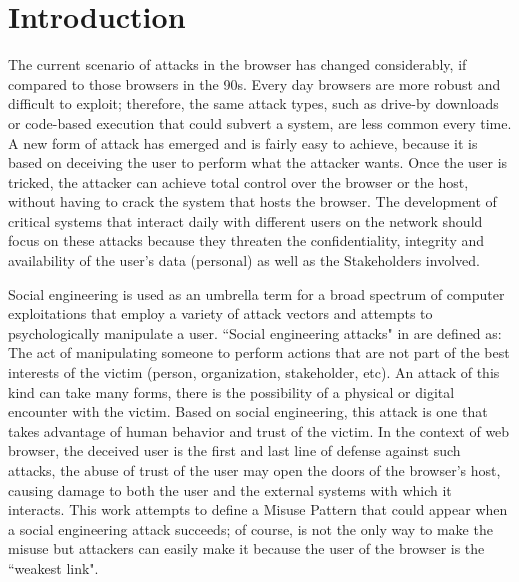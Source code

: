 \documentclass{sig-alternate-05-2015}
\begin{document}





\section{Introduction}
The current scenario of attacks in the browser has changed considerably, if compared to those browsers in the 90s. Every day browsers are more robust and difficult to exploit; therefore, the same attack types, such as drive-by downloads or code-based execution that could subvert a system, are less common every time. A new form of attack has emerged and is fairly easy to achieve, because it is based on deceiving the user to perform what the attacker wants. Once the user is tricked, the attacker can achieve total control over the browser or the host, without having to crack the system \cite{Rajab2013,Labs2013} that hosts the browser. The development of critical systems that interact daily with different users on the network should focus on these attacks because they threaten the confidentiality, integrity and availability of the user's data (personal) as well as the Stakeholders involved.

Social engineering is used as an umbrella term for a broad spectrum of computer exploitations that employ a variety of attack vectors and attempts to psychologically manipulate a user. ``Social engineering attacks" in \cite{socEngineeering} are defined as: The act of manipulating someone to perform actions that are not part of the best interests of the victim (person, organization, stakeholder, etc).  An attack of this kind can take many forms, there is the possibility of a physical or digital encounter with the victim. Based on social engineering, this attack is one that takes advantage of human behavior and trust of the victim. In the context of web browser, the deceived user is the first and last line of defense against such attacks, the abuse of trust of the user may open the doors of the browser's host, causing damage to both the user and the external systems with which it interacts. This work attempts to define a Misuse Pattern that could appear when a social engineering attack succeeds; of course, is not the only way to make the misuse but attackers can easily make it because the user of the browser is the ``weakest link".
\end{document}
